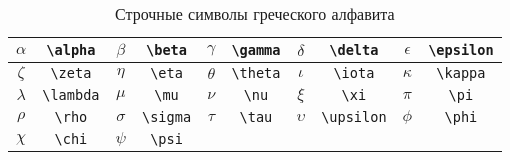 \begin{table}
	\begin{tabular}{|c|c||c|c||c|c||c|c||c|c|}
		\hline $\alpha$ & \Verb|\alpha| 
		& $\beta$ & \Verb|\beta| 
		& $\gamma$ & \Verb|\gamma| 
		& $\delta$ & \Verb|\delta| 
		& $\epsilon$ & \Verb|\epsilon| \\
		\hline $\zeta$ & \Verb|\zeta| 
		& $\eta$ & \Verb|\eta| 
		& $\theta$ & \Verb|\theta| 
		& $\iota$ & \Verb|\iota| 
		& $\kappa$ & \Verb|\kappa| \\
		\hline $\lambda$ & \Verb|\lambda| 
		& $\mu$ & \Verb|\mu| 
		& $\nu$ & \Verb|\nu| 
		& $\xi$ & \Verb|\xi| 
		& $\pi$ & \Verb|\pi| \\
		\hline $\rho$ & \Verb|\rho| 
		& $\sigma$ & \Verb|\sigma| 
		& $\tau$ & \Verb|\tau| 
		& $\upsilon$ & \Verb|\upsilon|
		& $\phi$ & \Verb|\phi| \\
		\hline $\chi$ & \Verb|\chi| 
		& $\psi$ & \Verb|\psi| 
		&&&&&&\\
		\hline
	\end{tabular}
	\caption{Строчные символы греческого алфавита}
\end{table}